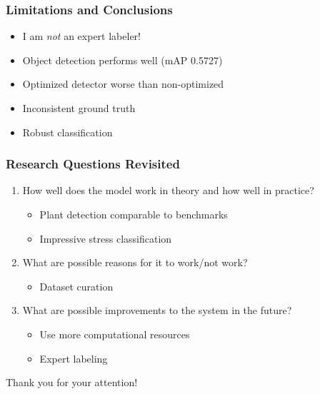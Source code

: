 \documentclass{beamer}
\begin{document}
\begin{frame}
  \frametitle{Limitations and Conclusions}
  \begin{itemize}
    \setlength{\itemsep}{0.75\baselineskip}
  \item I am \emph{not} an expert labeler! \pause
  \item Object detection performs well (mAP 0.5727) \pause
  \item Optimized detector worse than non-optimized \pause
  \item Inconsistent ground truth \pause
  \item Robust classification
  \end{itemize}
\end{frame}

\begin{frame}
  \frametitle{Research Questions Revisited}
  \begin{enumerate}
    \setlength{\itemsep}{1.1\baselineskip}
  \item How well does the model work in theory and how well in practice? \pause
    \begin{itemize}
    \item Plant detection comparable to benchmarks \pause
    \item Impressive stress classification \pause
    \end{itemize}
  \item What are possible reasons for it to work/not work? \pause
    \begin{itemize}
    \item Dataset curation \pause
    \end{itemize}
  \item What are possible improvements to the system in the future? \pause
    \begin{itemize}
    \item Use more computational resources \pause
    \item Expert labeling
    \end{itemize}
  \end{enumerate}
\end{frame}

\begin{frame}
	\centering
	\Large
	Thank you for your attention!
\end{frame}
\end{document}
